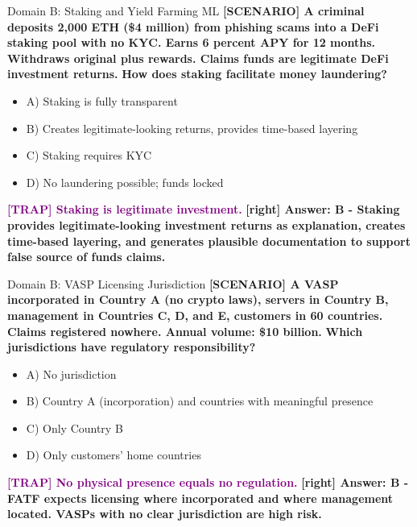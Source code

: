 \documentclass[11pt,a4paper]{beamer}
\newcommand{\trap}[1]{\textcolor{purple}{\textbf{[TRAP] #1}}}
\newcommand{\correct}[1]{\textcolor{green!50!black}{\textbf{[right] #1}}}
\newcommand{\scenario}[1]{\textcolor{blue!70!black}{\textbf{[SCENARIO] #1}}}
\begin{document}
\begin{frame}{Domain B: Staking and Yield Farming ML}
\scenario{A criminal deposits 2,000 ETH (\$4 million) from phishing scams into a DeFi staking pool with no KYC. Earns 6 percent APY for 12 months. Withdraws original plus rewards. Claims funds are legitimate DeFi investment returns.}
\vspace{0.2cm}
\textbf{How does staking facilitate money laundering?}
\vspace{0.2cm}
\begin{itemize}
    \item A) Staking is fully transparent
    \item B) Creates legitimate-looking returns, provides time-based layering
    \item C) Staking requires KYC
    \item D) No laundering possible; funds locked
\end{itemize}
\vspace{0.2cm}
\trap{Staking is legitimate investment.}
\correct{Answer: B - Staking provides legitimate-looking investment returns as explanation, creates time-based layering, and generates plausible documentation to support false source of funds claims.}
\end{frame}

\begin{frame}{Domain B: VASP Licensing Jurisdiction}
\scenario{A VASP incorporated in Country A (no crypto laws), servers in Country B, management in Countries C, D, and E, customers in 60 countries. Claims registered nowhere. Annual volume: \$10 billion.}
\vspace{0.2cm}
\textbf{Which jurisdictions have regulatory responsibility?}
\vspace{0.2cm}
\begin{itemize}
    \item A) No jurisdiction
    \item B) Country A (incorporation) and countries with meaningful presence
    \item C) Only Country B
    \item D) Only customers' home countries
\end{itemize}
\vspace{0.2cm}
\trap{No physical presence equals no regulation.}
\correct{Answer: B - FATF expects licensing where incorporated and where management located. VASPs with no clear jurisdiction are high risk.}
\end{frame}
\end{document}
